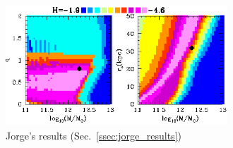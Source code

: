\begin{figure}
\includegraphics[width=83mm]{./figures/jorge_results.png}
  \caption{Jorge's results (Sec.~\ref{ssec:jorge_results})}
  \label{plot_jorge_results}
\end{figure}
